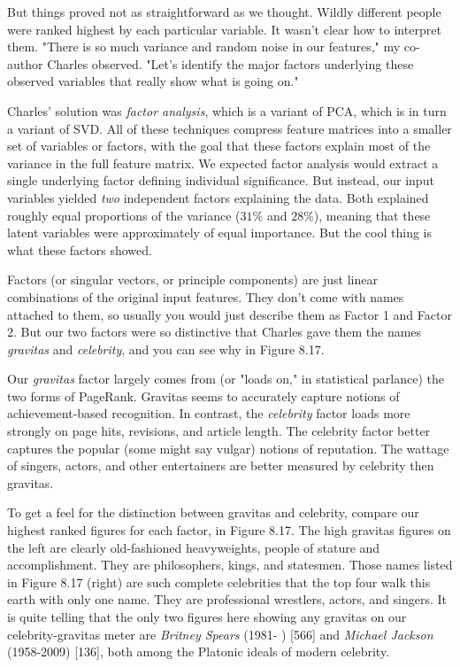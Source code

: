 \documentclass[10pt]{article}
\begin{document}
But things proved not as straightforward as we thought. Wildly different people were ranked highest by each particular variable. It wasn't clear how to interpret them. "There is so much variance and random noise in our features," my co-author Charles observed. "Let's identify the major factors underlying these observed variables that really show what is going on."

Charles' solution was \textit{factor analysis}, which is a variant of PCA, which is in turn a variant of SVD. All of these techniques compress feature matrices into a smaller set of variables or factors, with the goal that these factors explain most of the variance in the full feature matrix. We expected factor analysis would extract a single underlying factor defining individual significance. But instead, our input variables yielded \textit{two} independent factors explaining the data. Both explained roughly equal proportions of the variance ($31\%$ and $28\%$), meaning that these latent variables were approximately of equal importance. But the cool thing is what these factors showed.

Factors (or singular vectors, or principle components) are just linear combinations of the original input features. They don't come with names attached to them, so usually you would just describe them as Factor 1 and Factor 2. But our two factors were so distinctive that Charles gave them the names \textit{gravitas} and \textit{celebrity}, and you can see why in Figure 8.17.

Our \textit{gravitas} factor largely comes from (or "loads on," in statistical parlance) the two forms of PageRank. Gravitas seems to accurately capture notions of achievement-based recognition. In contrast, the \textit{celebrity} factor loads more strongly on page hits, revisions, and article length. The celebrity factor better captures the popular (some might say vulgar) notions of reputation. The wattage of singers, actors, and other entertainers are better measured by celebrity then gravitas.

To get a feel for the distinction between gravitas and celebrity, compare our highest ranked figures for each factor, in Figure 8.17. The high gravitas figures on the left are clearly old-fashioned heavyweights, people of stature and accomplishment. They are philosophers, kings, and statesmen. Those names listed in Figure 8.17 (right) are such complete celebrities that the top four walk this earth with only one name. They are professional wrestlers, actors, and singers. It is quite telling that the only two figures here showing any gravitas on our celebrity-gravitas meter are \textit{Britney Spears} (1981- ) [566] and \textit{Michael Jackson} (1958-2009) [136], both among the Platonic ideals of modern celebrity.
\end{document}
